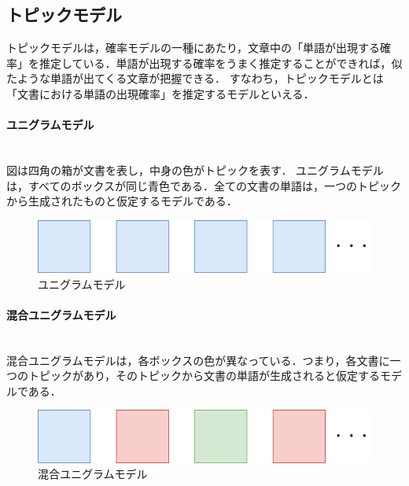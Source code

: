 \subsection{トピックモデル}
トピックモデルは，確率モデルの一種にあたり，文章中の「単語が出現する確率」を推定している．単語が出現する確率をうまく推定することができれば，似たような単語が出てくる文章が把握できる．
すなわち，トピックモデルとは「文書における単語の出現確率」を推定するモデルといえる．
\paragraph{ユニグラムモデル}\ \\
図は四角の箱が文書を表し，中身の色がトピックを表す．
ユニグラムモデルは，すべてのボックスが同じ青色である．全ての文書の単語は，一つのトピックから生成されたものと仮定するモデルである．
\begin{figure}[htbp]
 \begin{center}
  \includegraphics[width=\textwidth]{../images/2.Related_Work/topicModel-unigram.png}
  \caption{ユニグラムモデル}
  \label{Fig:unigram}
  \vspace{-10pt}
 \end{center}
\end{figure}
\paragraph{混合ユニグラムモデル}\ \\
混合ユニグラムモデルは，各ボックスの色が異なっている．つまり，各文書に一つのトピックがあり，そのトピックから文書の単語が生成されると仮定するモデルである．
\begin{figure}[htbp]
 \begin{center}
  \includegraphics[width=\textwidth]{../images/2.Related_Work/topicModel-mixUnigram.png}
  \caption{混合ユニグラムモデル}
  \label{Fig:mixUnigram}
  \vspace{-10pt}
 \end{center}
\end{figure}
